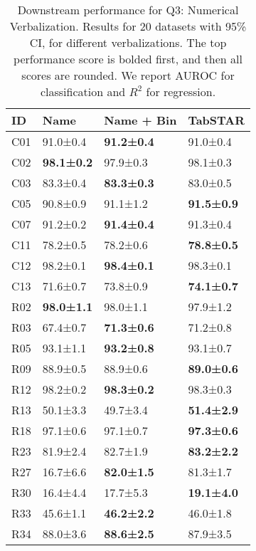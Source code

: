 \begin{table}
\center
\caption{Downstream performance for Q3: Numerical Verbalization. Results for 20 datasets with 95\% CI, for different verbalizations. The top performance score is bolded first, and then all scores are rounded. We report AUROC for classification and $R^2$ for regression.}
\label{tab:analysis_numerical_exp}
\begin{tabular}{llll}
\toprule
ID & Name & Name + Bin & TabSTAR \\
\midrule
C01 & 91.0±0.4 & \textbf{91.2±0.4} & 91.0±0.4 \\
C02 & \textbf{98.1±0.2} & 97.9±0.3 & 98.1±0.3 \\
C03 & 83.3±0.4 & \textbf{83.3±0.3} & 83.0±0.5 \\
C05 & 90.8±0.9 & 91.1±1.2 & \textbf{91.5±0.9} \\
C07 & 91.2±0.2 & \textbf{91.4±0.4} & 91.3±0.4 \\
C11 & 78.2±0.5 & 78.2±0.6 & \textbf{78.8±0.5} \\
C12 & 98.2±0.1 & \textbf{98.4±0.1} & 98.3±0.1 \\
C13 & 71.6±0.7 & 73.8±0.9 & \textbf{74.1±0.7} \\
R02 & \textbf{98.0±1.1} & 98.0±1.1 & 97.9±1.2 \\
R03 & 67.4±0.7 & \textbf{71.3±0.6} & 71.2±0.8 \\
R05 & 93.1±1.1 & \textbf{93.2±0.8} & 93.1±0.7 \\
R09 & 88.9±0.5 & 88.9±0.6 & \textbf{89.0±0.6} \\
R12 & 98.2±0.2 & \textbf{98.3±0.2} & 98.3±0.3 \\
R13 & 50.1±3.3 & 49.7±3.4 & \textbf{51.4±2.9} \\
R18 & 97.1±0.6 & 97.1±0.7 & \textbf{97.3±0.6} \\
R23 & 81.9±2.4 & 82.7±1.9 & \textbf{83.2±2.2} \\
R27 & 16.7±6.6 & \textbf{82.0±1.5} & 81.3±1.7 \\
R30 & 16.4±4.4 & 17.7±5.3 & \textbf{19.1±4.0} \\
R33 & 45.6±1.1 & \textbf{46.2±2.2} & 46.0±1.8 \\
R34 & 88.0±3.6 & \textbf{88.6±2.5} & 87.9±3.5 \\
\bottomrule
\end{tabular}
\end{table}